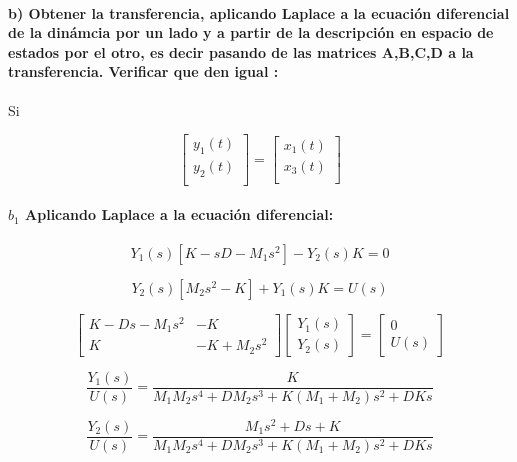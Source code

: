\documentclass[a4paper]{article}
\begin{document}
\paragraph{b) Obtener la transferencia, aplicando Laplace a la ecuación diferencial de la dinámcia por un lado
	y a partir de la descripción en espacio de estados por el otro, es decir pasando de las matrices
	A,B,C,D a la transferencia. Verificar que den igual : }

Si 

\begin{equation}
	\begin{bmatrix}
		y_1(t) \\
		y_2(t) \\
	\end{bmatrix}
	=
	\begin{bmatrix}
		x_1(t)\\
		x_3(t) \\ 
	\end{bmatrix}
\end{equation}

\paragraph{$b_1$ Aplicando Laplace a la ecuación diferencial:}


\begin{equation}
	Y_1(s) [ K - sD - M_1 s^2] - Y_2(s) K = 0
\end{equation}

\begin{equation}
	Y_2(s) [M_2 s^2 - K  ] + Y_1(s) K = U(s) 
\end{equation}

\[
\begin{bmatrix}
	K-Ds-M_1s^2 & -K \\
	K & -K+M_2s^2
\end{bmatrix}
\begin{bmatrix}
	Y_1(s)\\
	Y_2(s)
\end{bmatrix}
=
\begin{bmatrix}
	0\\
	U(s)
\end{bmatrix}
\]


\[
\frac{Y_1(s)}{U(s)}
=
\frac{K}{
	M_1M_2s^4
	+DM_2s^3
	+K(M_1+M_2)s^2
	+DKs
}
\]



\[
\frac{Y_2(s)}{U(s)}
=
\frac{M_1s^2+Ds+K}{
	M_1M_2s^4
	+DM_2s^3
	+K(M_1+M_2)s^2
	+DKs
}
\]
\end{document}

